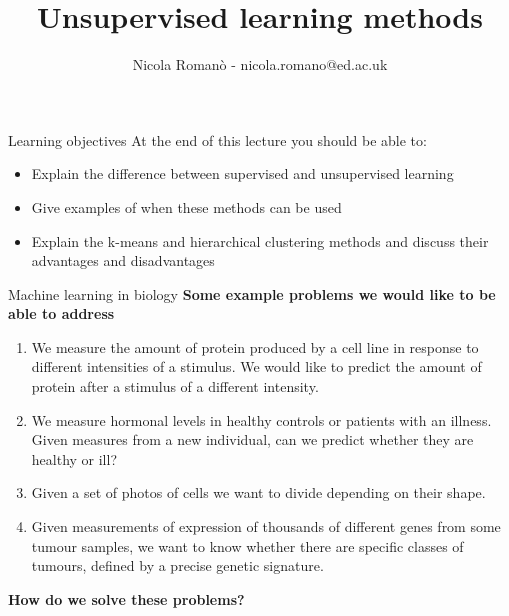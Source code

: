 \documentclass[9pt]{beamer}
\author{Nicola Roman\`o - nicola.romano@ed.ac.uk}
\title{Unsupervised learning methods}
\date{}
\begin{document}

\begin{frame}
\titlepage
\end{frame}

\begin{frame}
{Learning objectives}
At the end of this lecture you should be able to:
\begin{itemize}
\item Explain the difference between supervised and unsupervised learning
\item Give examples of when these methods can be used
\item Explain the k-means and hierarchical clustering methods and discuss their advantages and disadvantages
\end{itemize}
\end{frame}

\begin{frame}
{Machine learning in biology}
\textbf{Some example problems we would like to be able to address}
\pause
\begin{enumerate}
\item We measure the amount of protein produced by a cell line in response to different intensities of a stimulus. We would like to predict the amount of protein after a stimulus of a different intensity.
\pause
\item We measure hormonal levels in healthy controls or patients with an illness. Given measures from a new individual, can we predict whether they are healthy or ill?
\pause
\item Given a set of photos of cells we want to divide depending on their shape.
\pause
\item Given measurements of expression of thousands of different genes from some tumour samples, we want to know whether there are specific classes of tumours, defined by a precise genetic signature.
\pause
\end{enumerate}
\textbf{How do we solve these problems?}
\end{frame}
\end{document}
